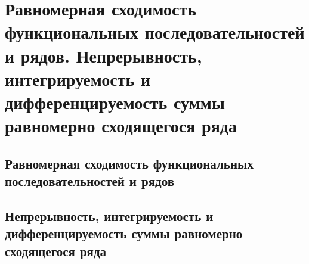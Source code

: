 \chapter{Равномерная сходимость функциональных последовательностей и рядов. Непрерывность, интегрируемость и дифференцируемость суммы равномерно сходящегося ряда}
\section{Равномерная сходимость функциональных последовательностей и рядов}
\section{Непрерывность, интегрируемость и дифференцируемость суммы равномерно сходящегося ряда}